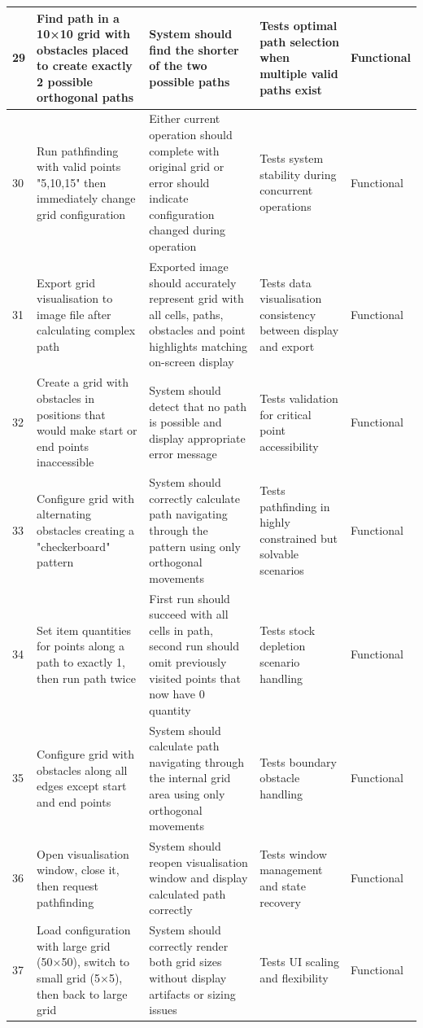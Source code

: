 \begin{longtable}{|p{}|p{}|p{}|p{}|p{}|}
	\hline
	29 & Find path in a 10×10 grid with obstacles placed to create exactly 2 possible orthogonal paths & System should find the shorter of the two possible paths & Tests optimal path selection when multiple valid paths exist & Functional \\
	\hline
	30 & Run pathfinding with valid points "5,10,15" then immediately change grid configuration & Either current operation should complete with original grid or error should indicate configuration changed during operation & Tests system stability during concurrent operations & Functional \\
	\hline
	31 & Export grid visualisation to image file after calculating complex path & Exported image should accurately represent grid with all cells, paths, obstacles and point highlights matching on-screen display & Tests data visualisation consistency between display and export & Functional \\
	\hline
	32 & Create a grid with obstacles in positions that would make start or end points inaccessible & System should detect that no path is possible and display appropriate error message & Tests validation for critical point accessibility & Functional \\
	\hline
	33 & Configure grid with alternating obstacles creating a "checkerboard" pattern & System should correctly calculate path navigating through the pattern using only orthogonal movements & Tests pathfinding in highly constrained but solvable scenarios & Functional \\
	\hline
	34 & Set item quantities for points along a path to exactly 1, then run path twice & First run should succeed with all cells in path, second run should omit previously visited points that now have 0 quantity & Tests stock depletion scenario handling & Functional \\
	\hline
	35 & Configure grid with obstacles along all edges except start and end points & System should calculate path navigating through the internal grid area using only orthogonal movements & Tests boundary obstacle handling & Functional \\
	\hline
	36 & Open visualisation window, close it, then request pathfinding & System should reopen visualisation window and display calculated path correctly & Tests window management and state recovery & Functional \\
	\hline
	37 & Load configuration with large grid (50×50), switch to small grid (5×5), then back to large grid & System should correctly render both grid sizes without display artifacts or sizing issues & Tests UI scaling and flexibility & Functional \\

\end{longtable}
